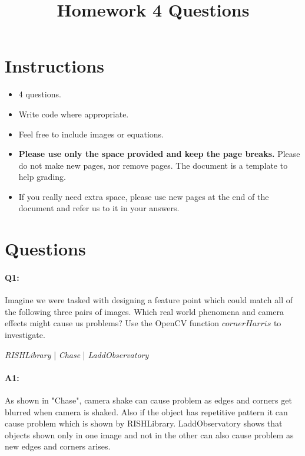 \date{}

\title{\vspace{-1cm}Homework 4 Questions}



\maketitle
\vspace{-3cm}
\thispagestyle{fancy}

\section*{Instructions}
\begin{itemize}
  \item 4 questions.
  \item Write code where appropriate.
  \item Feel free to include images or equations.
  \item \textbf{Please use only the space provided and keep the page breaks.} Please do not make new pages, nor remove pages. The document is a template to help grading.
  \item If you really need extra space, please use new pages at the end of the document and refer us to it in your answers.
\end{itemize}

\section*{Questions}

\paragraph{Q1:} Imagine we were tasked with designing a feature point which could match all of the following three pairs of images. Which real world phenomena and camera effects might cause us problems?
Use the OpenCV function $cornerHarris$ to investigate.

\emph{RISHLibrary} | \emph{Chase} | \emph{LaddObservatory}

\paragraph{A1:} As shown in "Chase", camera shake can cause problem as edges and corners get blurred when camera is shaked. Also if the object has repetitive pattern it can cause problem which is shown by 
RISHLibrary. LaddObservatory shows that objects shown only in one image and not in the other can also cause problem as new edges and corners arises. 


